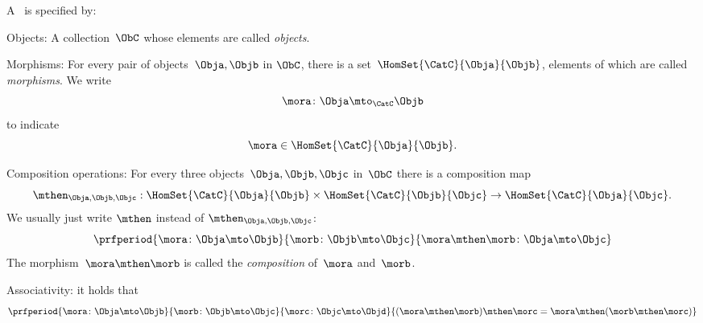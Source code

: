 \begin{ctdefinition}[Semicategory]
	\label{def:semicategory-compact}
	A \emph{}~\CatC is specified by:
	\begin{body}
		\constit
		\begin{compactenum}
			\item Objects: A collection\footnotemark~$\ObC$ whose elements are called \emph{objects}.
			\item Morphisms: For every pair of objects~$\Obja,\Objb$ in $\ObC$, there is a set~$\HomSet{\CatC}{\Obja}{\Objb}$, elements of which are called \emph{morphisms}.
			We write
			\begin{equation}
				\mora \colon \Obja \mto_\CatC \Objb
			\end{equation}
			to indicate
			\begin{equation}
				\mora \in \HomSet{\CatC}{\Obja}{\Objb}.
			\end{equation}
			\item Composition operations: For every three objects~$\Obja,\Objb,\Objc$ in~$\ObC$ there is a composition map
			\begin{equation}
				\mthen_{\Obja,\Objb,\Objc}: \HomSet{\CatC}{\Obja}{\Objb} \times \HomSet{\CatC}{\Objb}{\Objc}\to \HomSet{\CatC}{\Obja}{\Objc}.
			\end{equation}
			We usually just write $\mthen$ instead of $\mthen_{\Obja,\Objb,\Objc}$:
			\begin{equation}
				\prfperiod{
					\mora \colon \Obja \mto \Objb
				}{
					\morb\colon \Objb \mto \Objc
				}{
					\mora \mthen \morb \colon \Obja \mto \Objc
				}
			\end{equation}
			The morphism~$\mora \mthen \morb$ is called the \emph{composition} of~$\mora$ and~$\morb$.
		\end{compactenum}
		\condit
		\begin{compactenum}
			\item Associativity: it holds that
			\begin{equation}
				\prfperiod{
					\mora\colon \Obja \mto \Objb
				}{
					\morb\colon \Objb \mto \Objc
				}{
					\morc\colon \Objc \mto \Objd
				}{
					(\mora\mthen \morb)
					\mthen \morc= \mora \mthen (\morb \mthen \morc)
				}
			\end{equation}
		\end{compactenum}
	\end{body}
\end{ctdefinition}

